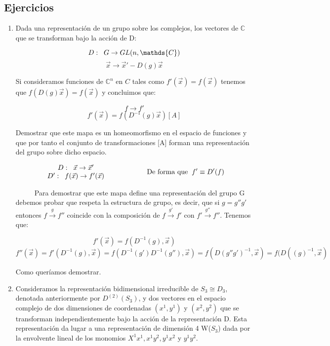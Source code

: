 \documentclass{article}
\begin{document}
\newpage
\subsection{Ejercicios}

\begin{enumerate}
    \item Dada una representación de un grupo sobre los complejos, los vectores de $\mathds{C}$ que se transforman bajo la acción de D:

    $$D: \hspace{0.2cm} G \to GL(n,\mathds{C})$$
    $$\Vec{x}\to \Vec{x}'-D(g)\Vec{x}$$

    Si consideramos funciones de $\mathds{C}^n$ en $C$ tales como $f'(\Vec{x})=f(\Vec{x})$ tenemos que $f(D(g)\Vec{x})=f(\Vec{x})$ y concluimos que:

    $$f\longrightarrow f'$$
    $$f'(\Vec{x})=f(D^{-1}(g)\Vec{x})[A]$$

    Demostrar que este mapa es un homeomorfismo en el espacio de funciones y que por tanto el conjunto de transformaciones [A] forman una representación del grupo sobre dicho espacio.

    $$\begin{array}{cc}
         D: \hspace{0.2cm} \Vec{x}\to \Vec{x}'  \\
         D': \hspace{0.2cm} f(\Vec{x})\to f'(\Vec{x})
    \end{array} \hspace{2cm} \text{De forma que} \hspace{0.2cm} f'\equiv D'(f)$$

    \smallskip
    $\hspace{1cm}$ Para demostrar que este mapa define una representación del grupo G debemos probar que respeta la estructura de grupo, es decir, que si $g=g''g'$ entonces $f\overset{g}{\longrightarrow} f''$ coincide con la composición de $f \overset{g'}{\longrightarrow} f'$ con $f'\overset{g''}{\longrightarrow}f''$. Tenemos que:

    $$f'(\Vec{x})=f(D^{-1}(g),\Vec{x})$$
    $$f''(\Vec{x})=f'(D^{-1}(g), \Vec{x})=f(D^{-1}(g')D^{-1}(g''),\Vec{x
    })=f(D(g''g')^{-1},\Vec{x})=f(D((g)^{-1},\Vec{x})$$

    Como queríamos demostrar.

    \item Consideramos la representación bidimensional irreducible de $S_3 \cong D_3$, denotada anteriormente por $D^{(2)}(S_3)$, y dos vectores en el espacio complejo de dos dimensiones de coordenadas $(x^1,y^1)$ y $(x^2,y^2)$ que se transforman independientemente bajo la acción de la representación D. Esta representación da lugar a una representación de dimensión 4 W($S_3$) dada por la envolvente lineal de los monomios $X^1x^1, x^1y^2,y^1x^2$ y $y^1y^2$.


\end{enumerate}
\end{document}
